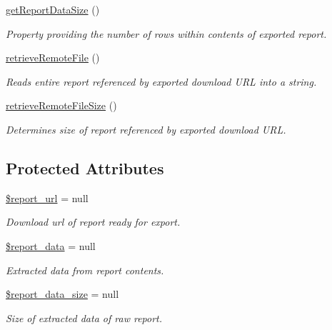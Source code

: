 \begin{DoxyCompactItemize}
\hyperlink{classTune_1_1Management_1_1Reports_1_1ReportReaderBase_abd9214311166df72bab2424c2aae273b}{get\-Report\-Data\-Size} ()
\begin{DoxyCompactList}\small\item\em Property providing the number of rows within contents of exported report. \end{DoxyCompactList}\item 
\hyperlink{classTune_1_1Management_1_1Reports_1_1ReportReaderBase_ad624d6972c44e8f45edfaaf13b9cfea6}{retrieve\-Remote\-File} ()
\begin{DoxyCompactList}\small\item\em Reads entire report referenced by exported download U\-R\-L into a string. \end{DoxyCompactList}\item 
\hyperlink{classTune_1_1Management_1_1Reports_1_1ReportReaderBase_aa0e1e91f3872905d85a9d3fa8964a5b8}{retrieve\-Remote\-File\-Size} ()
\begin{DoxyCompactList}\small\item\em Determines size of report referenced by exported download U\-R\-L. \end{DoxyCompactList}\end{DoxyCompactItemize}
\subsection*{Protected Attributes}
\begin{DoxyCompactItemize}
\item 
\hyperlink{classTune_1_1Management_1_1Reports_1_1ReportReaderBase_a90591d693700efd4d05f2b43ac08b552}{\$report\-\_\-url} = null
\begin{DoxyCompactList}\small\item\em Download url of report ready for export. \end{DoxyCompactList}\item 
\hyperlink{classTune_1_1Management_1_1Reports_1_1ReportReaderBase_a4fd2422c90a019e4d1b7d4f4cf2e1541}{\$report\-\_\-data} = null
\begin{DoxyCompactList}\small\item\em Extracted data from report contents. \end{DoxyCompactList}\item 
\hyperlink{classTune_1_1Management_1_1Reports_1_1ReportReaderBase_a41566a442e241ede89e506901b39fb9e}{\$report\-\_\-data\-\_\-size} = null
\begin{DoxyCompactList}\small\item\em Size of extracted data of raw report. \end{DoxyCompactList}\end{DoxyCompactItemize}


